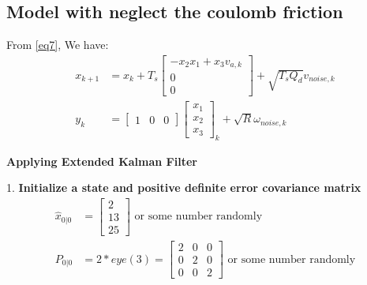 \documentclass[12pt,a4paper]{article}
\begin{document}
	
	
	
	\subsection{Model with neglect the coulomb friction}
	From \autoref{eq7}, We have:
	\[\begin{split}
		x_{k+1} &= x_k + T_s
		\begin{bmatrix}
			-x_2 x_1 + x_3 v_{a,k} \\
			0                      \\
			0                      
		\end{bmatrix} +\sqrt{T_s Q_d}v_{noise,k}\\
		y_k &= 
		\begin{bmatrix}
			1 & 0 & 0 
		\end{bmatrix}
		\begin{bmatrix}
			x_1 \\
			x_2 \\
			x_3 
		\end{bmatrix}_k+\sqrt{R}\omega_{noise,k}
	\end{split}\]
	\begin{center}
		\textbf{Applying Extended Kalman Filter}
	\end{center}
	1. \textbf{Initialize a state and positive definite error covariance matrix}
	\[\begin{split}
		\hat{x}_{0|0} &= \begin{bmatrix}
			2 \\
			13 \\
			25
		\end{bmatrix} \text{ or some number randomly}\\
		P_{0|0} &= 2*eye(3) = 
		\begin{bmatrix}
			2 & 0 & 0 \\
			0 & 2 & 0 \\
			0 & 0 & 2 
		\end{bmatrix} \text{ or some number randomly}
	\end{split}\]
	
\end{document}
